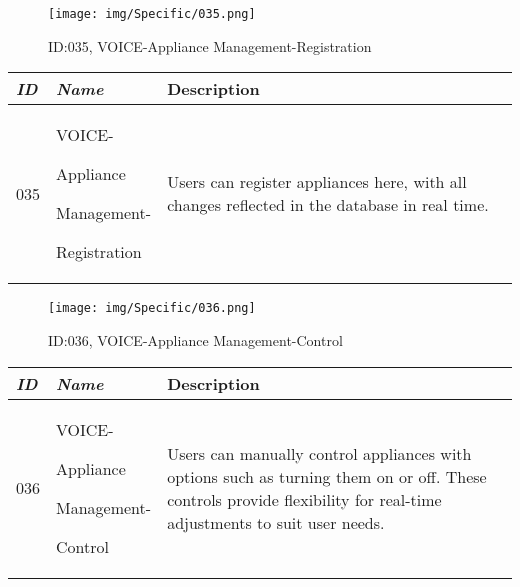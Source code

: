 \documentclass[conference]{IEEEtran}
\begin{document}
\begin{enumerate}[label=\arabic*]
    \vspace{2em}

    \begin{figure}[h]
        \centering
        \texttt{[image: img/Specific/035.png]}
        \caption{ID:035, VOICE-Appliance Management-Registration}
    \end{figure}

    \begin{table}[h]
    \def\arraystretch{1.2} \small
        \begin{tabular}{|p{1cm}|p{1.8cm}|p{4.8cm}|}
        \hline
            \textit{\textbf{ID}} & \textit{\textbf{Name}} & {\textbf{Description}} \\
        \hline
            035 \par & VOICE-\par Appliance\par Management-\par Registration & Users can register appliances here, with all changes reflected in the database in real time. \\
        \hline
        \end{tabular}
    \end{table}

    \newpage

    \begin{figure}[h]
        \centering
        \texttt{[image: img/Specific/036.png]}
        \caption{ID:036, VOICE-Appliance Management-Control}
    \end{figure}

    \begin{table}[h]
    \def\arraystretch{1.2} \small
        \begin{tabular}{|p{1cm}|p{1.8cm}|p{4.8cm}|}
        \hline
            \textit{\textbf{ID}} & \textit{\textbf{Name}} & {\textbf{Description}} \\
        \hline
            036 \par & VOICE-\par Appliance\par Management-\par Control & Users can manually control appliances with options such as turning them on or off. These controls provide flexibility for real-time adjustments to suit user needs. \\
        \hline
        \end{tabular}
    \end{table}


\end{enumerate}
\end{document}
